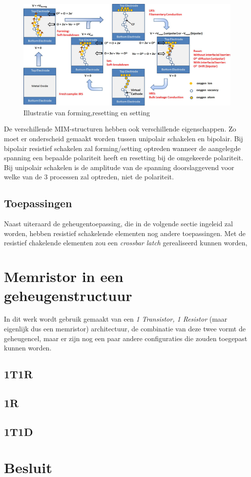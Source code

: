 \begin{figure}
  \centering
  \includegraphics[scale=0.22]{../fig/hfdstk-cel-forming-reset-set.png}
  \caption{Illustratie van forming,resetting en setting \cite{Won12}}
  \label{fig:forming-reset-set}
\end{figure}

De verschillende MIM-structuren hebben ook verschillende eigenschappen. Zo moet er onderscheid gemaakt worden tussen unipolair schakelen en bipolair. Bij bipolair resistief schakelen zal forming/setting optreden wanneer de aangelegde spanning een bepaalde polariteit heeft en resetting bij de omgekeerde polariteit. Bij unipolair schakelen is de amplitude van de spanning doorslaggevend voor welke van de 3 processen zal optreden, niet de polariteit. 


\subsection{Toepassingen}

Naast uiteraard de geheugentoepassing, die in de volgende sectie ingeleid zal worden, hebben resistief schakelende elementen nog andere toepassingen.
Met de resistief chakelende elementen zou een \emph{crossbar latch} gerealiseerd kunnen worden, 


\section{Memristor in een geheugenstructuur}

In dit werk wordt gebruik gemaakt van een \emph{1 Transistor, 1 Resistor} (maar eigenlijk dus een memristor) architectuur, de combinatie van deze twee vormt de geheugencel, maar er zijn nog een paar andere configuraties die zouden toegepast kunnen worden.

\subsection{1T1R}

\subsection{1R}

\subsection{1T1D}



\section{Besluit}

